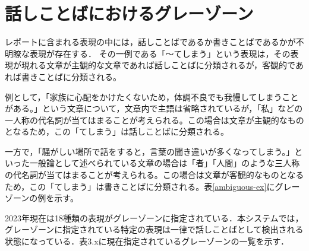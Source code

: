 \section{話しことばにおけるグレーゾーン}
レポートに含まれる表現の中には，話しことばであるか書きことばであるかが不明瞭な表現が存在する．
その一例である「～てしまう」という表現は，その表現が現れる文章が主観的な文章であれば話しことばに分類されるが，客観的であれば書きことばに分類される。

例として，「家族に心配をかけたくないため，体調不良でも我慢してしまうことがある。」という文章について，文章内で主語は省略されているが，「私」などの一人称の代名詞が当てはまることが考えられる。この場合は文章が主観的なものとなるため，この「てしまう」は話しことばに分類される。

一方で，「騒がしい場所で話をすると，言葉の聞き違いが多くなってしまう。」といった一般論として述べられている文章の場合は「者」「人間」のような三人称の代名詞が当てはまることが考えられる。この場合は文章が客観的なものとなるため，この「てしまう」は書きことばに分類される。表\ref{ambiguous-ex}にグレーゾーンの例を示す。



2023年現在は18種類の表現がグレーゾーンに指定されている．本システムでは，グレーゾーンに指定されている特定の表現は一律で話しことばとして検出される状態になっている．表3.xに現在指定されているグレーゾーンの一覧を示す．

